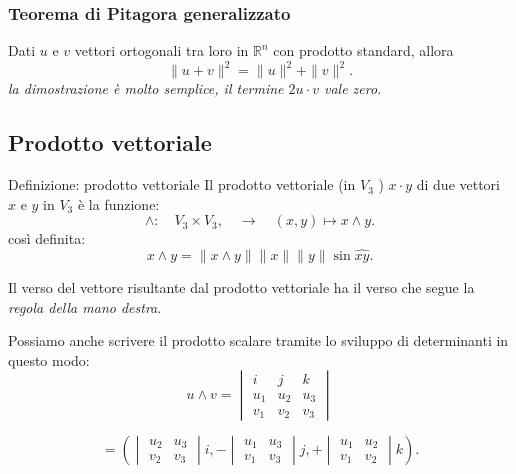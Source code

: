 \documentclass[x11names]{article}
\begin{document}
\begin{center}
	\colorbox{myred}{\begin{minipage}{5.75in}
			\begin{redes}{}
			\subsubsection{Teorema di Pitagora generalizzato}
			Dati $u$ e $v$ vettori ortogonali tra loro in $\mathbb{R}^n$ con prodotto standard, allora
			\[
			\|u+v\|^2 = \|u\|^2 + \|v\|^2
			.\] 
			\textit{la dimostrazione è molto semplice, il termine $2u\cdot v$ vale zero.}		
			\end{redes}
	\end{minipage}}        
\end{center}





\subsection{Prodotto vettoriale}

\begin{center}
\colorbox{myblue}{\begin{minipage}{5.75in}
\begin{blues}{Definizione: prodotto vettoriale}
Il prodotto vettoriale (in $V_3$ ) $x\cdot y$ di due vettori $x$ e $y$ in $V_3$ è la funzione:
\[
\wedge : \quad V_3 \times V_3, \quad \longrightarrow \quad \left(x,y\right) \mapsto x \wedge y
.\] 
così definita:
\[
x \wedge y  = \|x\wedge y\| \|x\| \|y\| \sin{\hat{xy}}
.\] 

\end{blues}
\end{minipage}}        
\end{center}
Il verso del vettore risultante dal prodotto vettoriale ha il verso che segue la \textit{regola della mano destra}.


\noindent
Possiamo anche scrivere il prodotto scalare tramite lo sviluppo di determinanti in questo modo:
\[
u \wedge v = 
\begin{vmatrix}
     i& j & k \\
     u_1& u_2 & u_3 \\
     v_1& v_2 & v_3 
\end{vmatrix}
\] 

\[
	=
\left(
\begin{vmatrix}
    u_2 & u_3  \\
     v_2& v_3  
\end{vmatrix}i,
- \begin{vmatrix}
    u_1 &u_3 \\
     v_1&v_3   
\end{vmatrix}j, +
\begin{vmatrix}
    u_1 & u_2 \\
     v_1 &  v_2   
\end{vmatrix}k
\right)
.\] 
\end{document}
